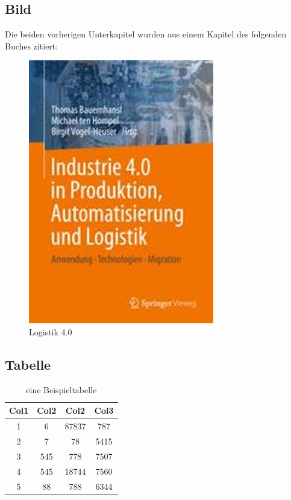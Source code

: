 \subsection{Bild}
Die beiden vorherigen Unterkapitel wurden aus einem Kapitel des folgenden Buches zitiert:
\begin{figure}[h]
	\begin{center}
		\includegraphics[scale=0.333]{figures/Logistik_4_0.jpg}
		\caption{Logistik 4.0}
		\label{fig:test}
	\end{center}
\end{figure}

\newpage
\subsection{Tabelle}
\begin{table}[h]
	\begin{center}
 		\begin{tabular}{c c c c}
			\toprule
			Col1 & Col2 & Col2 & Col3 \\ 
 			\midrule
 			1 & 6 & 87837 & 787 \\
			2 & 7 & 78 & 5415 \\
			3 & 545 & 778 & 7507 \\
			4 & 545 & 18744 & 7560 \\
			5 & 88 & 788 & 6344 \\ 
			\bottomrule
		\end{tabular}
		\caption{eine Beispieltabelle}
		\label{tab:test}
	\end{center}
\end{table}


